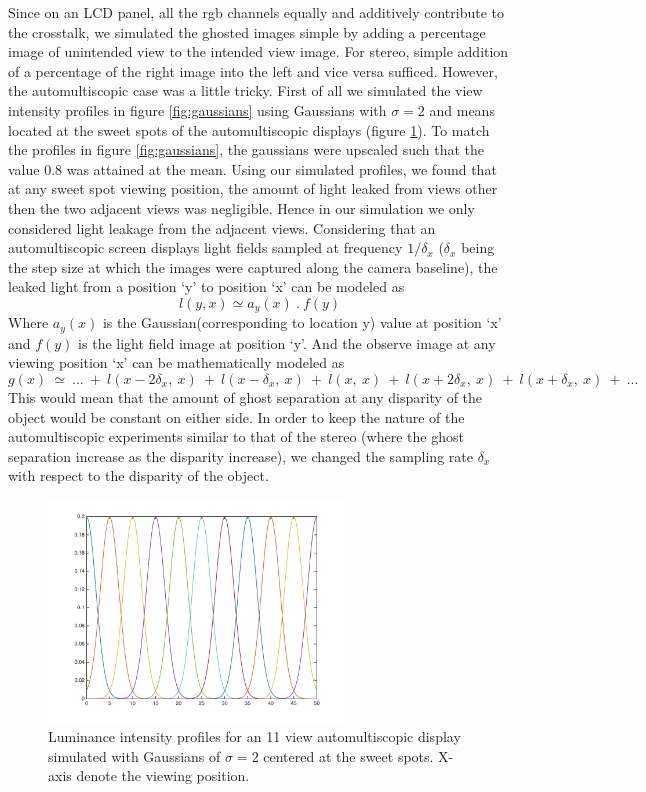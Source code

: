 Since on an LCD panel, all the rgb channels equally and additively contribute to the crosstalk, we simulated the ghosted images simple by adding a percentage image of unintended view to the intended view image. For stereo, simple addition of a percentage of the right image into the left and vice versa sufficed. However, the automultiscopic case was a little tricky. First of all we simulated the view intensity profiles in figure \ref{fig:gaussians} using Gaussians with $\sigma = 2$ and means located at the sweet spots of the automultiscopic displays (figure \ref{fig:sim_gaussians}). To match the profiles in figure \ref{fig:gaussians}, the gaussians were upscaled such that the value 0.8 was attained at the mean. Using our simulated profiles, we found that at any sweet spot viewing position, the amount of light leaked from views other then the two adjacent views was negligible. Hence in our simulation we only considered light leakage from the adjacent views. Considering that an automultiscopic screen displays light fields sampled at frequency $1/\delta_x$ ($\delta_x$ being the step size at which the images were captured along the camera baseline), the leaked light from a position `y' to position `x' can be modeled as
\begin{equation}
l(y,x) \simeq a_y(x)\:.\:f(y)
\label{eq:ct_leak_eq}
\end{equation}
Where $a_y(x)$ is the Gaussian(corresponding to location y) value at position `x' and $f(y)$ is the light field image at position `y'. And the observe image  at any viewing position `x' can be mathematically modeled as
\begin{equation}
g(x) \: \simeq \: ...\: +\: l(x-2\delta_x,\:x)\:+\: l(x-\delta_x,\:x)\:+\:l(x,\:x)\:+\: l(x+2\delta_x,\:x)\:+\: l(x+\delta_x,\:x)\:+ \:...
\label{eq:ct_sim_eq}
\end{equation}
This would mean that the amount of ghost separation at any disparity of the object would be constant on either side. In order to keep the nature of the automultiscopic experiments similar to that of the stereo (where the ghost separation increase as the disparity increase), we changed the sampling rate $\delta_x$ with respect to the disparity of the object.
 \begin{figure}
\centering
    \includegraphics[width=0.7\textwidth]{./Template_Figures/sim_gaussians}
    \caption{Luminance intensity profiles for an 11 view automultiscopic display simulated with Gaussians of $\sigma =2$ centered at the sweet spots. X-axis denote the viewing position.\label{fig:sim_gaussians}}
\end{figure}
